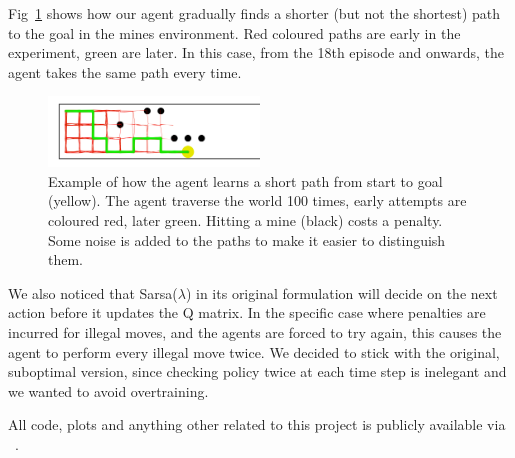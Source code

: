 Fig~\ref{fig:mineslearning} shows how our agent gradually finds a shorter (but not the shortest) path to the goal in the mines environment. Red coloured paths are early in the experiment, green are later. In this case, from the 18th episode and onwards, the agent takes the same path every time.

\begin{figure}[h]
    \centering
    \includegraphics[width=0.5\textwidth]{../data/minPlot.png}
    \caption{Example of how the agent learns a short path from start to goal (yellow). The agent traverse the world 100 times, early attempts are coloured red, later green. Hitting a mine (black) costs a penalty. Some noise is added to the paths to make it easier to distinguish them.}
    \label{fig:mineslearning}
\end{figure} 

We also noticed that Sarsa($\lambda$) in its original formulation will decide on the next action before it updates the Q matrix. In the specific case where penalties are incurred for illegal moves, and the agents are forced to try again, this causes the agent to perform every illegal move twice. We decided to stick with the original, suboptimal version, since checking policy twice at each time step is inelegant and we wanted to avoid overtraining.

All code, plots and anything other related to this project is publicly available via ~\cite{githubrepo}.
